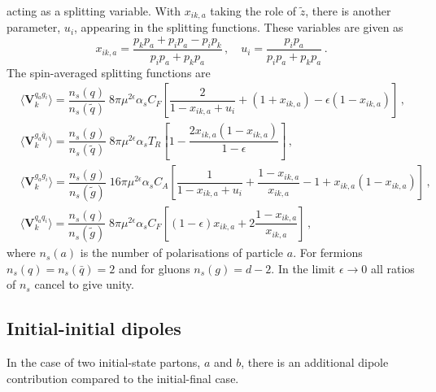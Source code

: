 \documentclass[main.tex]{subfiles}
\begin{document}
        acting as a splitting variable.
        With $x_{ik,a}$ taking the role of $\tilde{z}$, there is another
        parameter, $u_{i}$, appearing in the splitting functions.
        These variables are given as
        \begin{equation}\label{eqn:x_ika}
            x_{ik,a} = \dfrac{p_{k}p_{a}+p_{i}p_{a}-p_{i}p_{k}}{p_{i}p_{a} + p_{k}p_{a}} \, , \quad u_{i} = \dfrac{p_{i}p_{a}}{p_{i}p_{a} + p_{k}p_{a}} \, .
        \end{equation}
        The spin-averaged splitting functions are
        \begin{align}\label{eqn:V_aik}
            &\langle \boldsymbol{V}_{k}^{q_{a}g_{i}} \rangle = \dfrac{n_{s}(q)}{n_{s}(\tilde{q})} \; 8\pi \mu^{2\epsilon} \alpha_{s} C_{F} \left[\dfrac{2}{1-x_{ik,a} + u_{i}} + (1+x_{ik,a}) - \epsilon(1-x_{ik,a})\right] \, , \nonumber \\
            &\langle \boldsymbol{V}_{k}^{g_{a}\bar{q}_{i}} \rangle = \dfrac{n_{s}(g)}{n_{s}(\tilde{q})} \; 8\pi \mu^{2\epsilon} \alpha_{s} T_{R} \left[1 - \dfrac{2x_{ik,a}(1-x_{ik,a})}{1-\epsilon}\right] \, , \nonumber \\
            &\langle \boldsymbol{V}_{k}^{g_{a}g_{i}} \rangle = \dfrac{n_{s}(g)}{n_{s}(\tilde{g})} \; 16\pi \mu^{2\epsilon} \alpha_{s} C_{A} \left[\dfrac{1}{1-x_{ik,a} + u_{i}} + \dfrac{1-x_{ik,a}}{x_{ik,a}} - 1 + x_{ik,a}(1-x_{ik,a}) \right] \, , \nonumber \\
            &\langle \boldsymbol{V}_{k}^{q_{a}q_{i}} \rangle = \dfrac{n_{s}(q)}{n_{s}(\tilde{g})} \; 8\pi \mu^{2\epsilon} \alpha_{s} C_{F} \left[(1-\epsilon)x_{ik,a} + 2\dfrac{1-x_{ik,a}}{x_{ik,a}} \right] \, ,
        \end{align}
        where $n_{s}(a)$ is the number of polarisations of particle $a$.
        For fermions $n_{s}(q) = n_{s}(\bar{q}) = 2$
        and for gluons $n_{s}(g) = d-2$. In the limit $\epsilon \rightarrow 0$
        all ratios of $n_{s}$ cancel to give unity.

    \subsection{Initial-initial dipoles}
        In the case of two initial-state partons, $a$ and $b$, there
        is an additional dipole contribution compared to the initial-final case.
        
\end{document}
